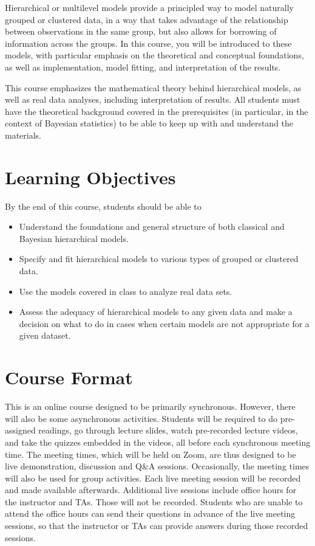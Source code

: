 \documentclass[11pt, a4paper]{article}
\begin{document}
Hierarchical or multilevel models provide a principled way to model naturally grouped or clustered data, in a way that takes advantage of the relationship between observations in the same group, but also allows for borrowing of information across the groups. In this course, you will be introduced to these models, with particular emphasis on the theoretical and conceptual foundations, as well as implementation, model fitting, and interpretation of the results.

This course emphasizes the mathematical theory behind hierarchical models, as well as real data analyses, including interpretation of results. All students must have the theoretical background covered in the prerequisites (in particular, in the context of Bayesian statistics) to be able to keep up with and understand the materials. 


\section{Learning Objectives}
By the end of this course, students should be able to
\begin{itemize}[label= {\color{darkblue}{\ArrowBoldRightStrobe}}]
	\item Understand the foundations and general structure of both classical and Bayesian hierarchical models.
	\item Specify and fit hierarchical models to various types of grouped or clustered data.
	\item Use the models covered in class to analyze real data sets.
	\item Assess the adequacy of hierarchical models to any given data and make a decision on what to do in cases when certain models are not appropriate for a given dataset.
\end{itemize}


\section{Course Format}
This is an online course designed to be primarily synchronous. However, there will also be some asynchronous activities. Students will be required to do pre-assigned readings, go through lecture slides, watch pre-recorded lecture videos, and take the quizzes embedded in the videos, all before each synchronous meeting time. The meeting times, which will be held on Zoom, are thus designed to be live demonstration, discussion and Q\&A sessions. Occasionally, the meeting times will also be used for group activities. Each live meeting session will be recorded and made available afterwards. Additional live sessions include office hours for the instructor and TAs. Those will not be recorded. Students who are unable to attend the office hours can send their questions in advance of the live meeting sessions, so that the instructor or TAs can provide answers during those recorded sessions.
\end{document}
